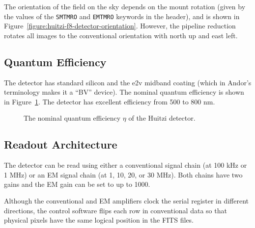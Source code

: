 The orientation of the field on the sky depends on the mount rotation (given by the values of the \verb|SMTMRO| and \verb|EMTMRO| keywords in the header), and is shown in Figure~\ref{figure:huitzi-f8-detector-orientation}. However, the pipeline reduction rotates all images to the conventional orientation with north up and east left.

\subsection{Quantum Efficiency}

The detector has standard silicon and the e2v midband coating (which in Andor's terminology makes it a “BV” device). The nominal quantum efficiency is shown in Figure~\ref{figure:huitzi-f8-detector-quantum-efficiency}. The detector has excellent efficiency from 500 to 800 nm.

\begin{figure}
\begin{center}
\end{center}
\caption{The nominal quantum efficiency $\eta$ of the Huitzi detector.}
\label{figure:huitzi-f8-detector-quantum-efficiency}
\end{figure}


\subsection{Readout Architecture}

The detector can be read using either a conventional signal chain (at 100 kHz or 1 MHz) or an EM signal chain (at 1, 10, 20, or 30 MHz). Both chains have two gains and the EM gain can be set to up to 1000. 

Although the conventional and EM amplifiers clock the serial register in different directions, the control software flips each row in conventional data so that physical pixels have the same logical position in the FITS files.

